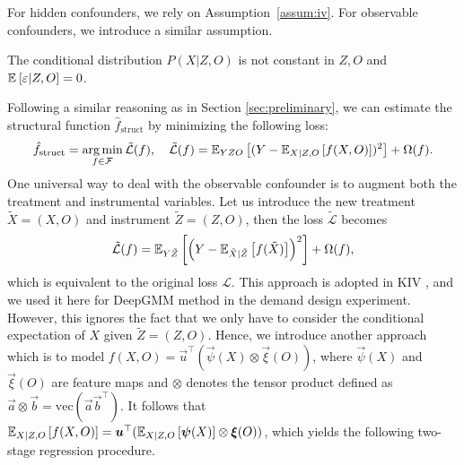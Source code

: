 For hidden confounders, we rely on Assumption~\ref{assum:iv}. For observable confounders, we introduce a similar assumption.
\begin{assum}\label{assum:iv-observable}
    The conditional distribution $P(X | Z, O)$ is not constant in $Z, O$ and $\expect{\varepsilon | Z,O} = 0$.
\end{assum}
Following a similar reasoning as in Section \ref{sec:preliminary}, we can estimate the structural function $\hat{f}_{\mathrm{struct}}$ by minimizing the following loss:
\begin{align*}
    \hat{f}_{\mathrm{struct}} = \argmin_{f \in \mathcal{F}} \tilde{\mathcal{L}}(f), \quad \tilde{\mathcal{L}}(f) = \expect[YZO]{(Y - \expect[X|Z,O]{f(X,O)})^2} + \Omega(f). 
\end{align*}
One universal way to deal with the observable confounder is to augment both the treatment and instrumental variables. Let us introduce the new treatment $\tilde{X} = (X,O)$ and instrument $\tilde{Z} = (Z,O)$, then  the loss $\tilde{\mathcal{L}}$ becomes 
\begin{align*}
    \tilde{\mathcal{L}}(f) = \expect[Y\tilde Z]{\left(Y - \expect[\tilde X|\tilde Z]{f(\tilde X)}\right)^2} + \Omega(f),
\end{align*}
which is equivalent to the original loss $\mathcal{L}$. This approach is adopted in KIV \citep{Singh2019}, and we used it here for DeepGMM method \citep{Bennett2019} in the demand design experiment. However, this ignores the fact that we only have to consider the conditional expectation of $X$ given $\tilde Z= (Z,O)$. Hence, we introduce another approach which is to model $f(X,O) = \vec{u}^\top (\vec{\psi}(X) \otimes \vec{\xi}(O))$, where  $\vec{\psi}(X)$ and $\vec{\xi}(O)$ are feature maps and $\otimes$ denotes the tensor product defined as $\vec{a} \otimes \vec{b} = \mathrm{vec}(\vec{a}\vec{b}^\top)$. It follows that $\expect[X|Z,O]{f(X,O)} = \vec{u}^\top (\expect[X|Z,O]{\vec{\psi}(X)} \otimes \vec{\xi}(O))$, which yields the following two-stage regression procedure.

